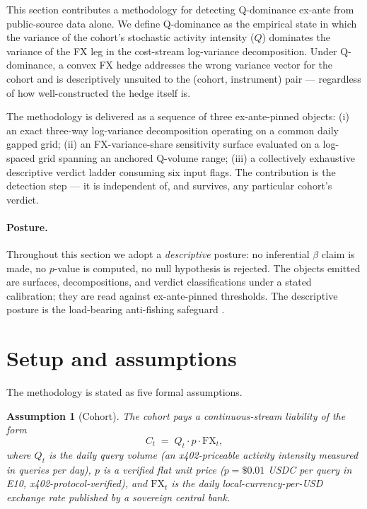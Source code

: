 \documentclass[11pt,letterpaper]{article}
\newcommand{\Cfx}{\mathrm{FX}}
\theoremstyle{assumption}
\newtheorem{assumption}{Assumption}
\begin{document}
This section contributes a methodology for detecting Q-dominance ex-ante from
public-source data alone. We define Q-dominance as the empirical state in
which the variance of the cohort's stochastic activity intensity ($Q$)
dominates the variance of the FX leg in the cost-stream log-variance
decomposition. Under Q-dominance, a convex FX hedge addresses the wrong
variance vector for the cohort and is descriptively unsuited to the (cohort,
instrument) pair --- regardless of how well-constructed the hedge itself is.

The methodology is delivered as a sequence of three ex-ante-pinned objects:
(i) an exact three-way log-variance decomposition operating on a common daily
gapped grid; (ii) an FX-variance-share sensitivity surface evaluated on a
log-spaced grid spanning an anchored Q-volume range; (iii) a collectively
exhaustive descriptive verdict ladder consuming six input flags. The
contribution is the detection step --- it is independent of, and survives,
any particular cohort's verdict.

\paragraph{Posture.}
Throughout this section we adopt a \emph{descriptive} posture: no inferential
$\beta$ claim is made, no $p$-value is computed, no null hypothesis is
rejected. The objects emitted are surfaces, decompositions, and verdict
classifications under a stated calibration; they are read against
ex-ante-pinned thresholds. The descriptive posture is the load-bearing
anti-fishing safeguard \citep{AbrigoSpecE10v07}.

\section{Setup and assumptions}
\label{sec:e10-setup}

The methodology is stated as five formal assumptions.

\begin{assumption}[Cohort]\label{ass:A1}
The cohort pays a continuous-stream liability of the form
\begin{equation}
  C_t \;=\; Q_t \cdot p \cdot \Cfx_t,
  \label{eq:cost-identity}
\end{equation}
where $Q_t$ is the daily query volume (an x402-priceable activity intensity
measured in queries per day), $p$ is a verified flat unit price
($p = \$0.01$ USDC per query in E10, x402-protocol-verified), and $\Cfx_t$ is
the daily local-currency-per-USD exchange rate published by a sovereign
central bank.
\end{assumption}
\end{document}
